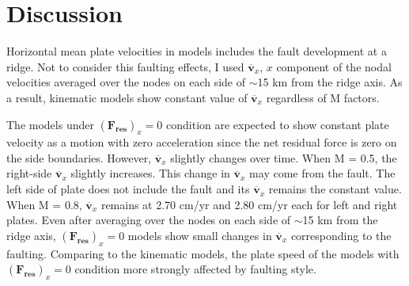 \documentclass[letterpaper,12pt,notitle]{memphisthesis}                     %
\begin{document}
\chapter{Discussion}

Horizontal mean plate velocities in models includes the fault development at a ridge. Not to consider this faulting effects, I used $\overline{\boldsymbol{v}}_{x}$, $x$ component of the nodal velocities averaged over the nodes on each side of $\sim$15 km from the ridge axis. As a result, kinematic models show constant value of $\overline{\boldsymbol{v}}_{x}$ regardless of M factors.

%

The models under $(\boldsymbol{F_{res}})_x=0$ condition are expected to show constant plate velocity as a motion with zero acceleration since the net residual force is zero on the side boundaries. However, $\overline{\boldsymbol{v}}_{x}$ slightly changes over time. When M = 0.5, the right-side $\overline{\boldsymbol{v}}_{x}$ slightly increases. This change in $\overline{\boldsymbol{v}}_{x}$ may come from the fault. The left side of plate does not include the fault and its $\overline{\boldsymbol{v}}_{x}$ remains the constant value. When M = 0.8, $\overline{\boldsymbol{v}}_{x}$ remains at 2.70 cm/yr and 2.80 cm/yr each for left and right plates.
Even after averaging over the nodes on each side of $\sim$15 km from the ridge axis, $(\boldsymbol{F_{res}})_x=0$ models show small changes in $\overline{\boldsymbol{v}}_x$ corresponding to the faulting. Comparing to the kinematic models, the plate speed of the models with $(\boldsymbol{F_{res}})_x=0$ condition more strongly affected by faulting style.
\end{document}
